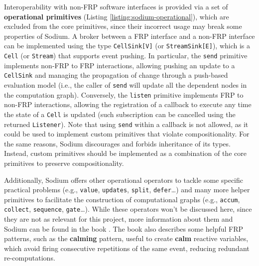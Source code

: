 Interoperability with non-\ac{FRP} software interfaces is provided via a set of
\textbf{operational primitives} (Listing \ref{listing:sodium-operational}),
which are excluded from the core primitives, since their incorrect usage may
break some properties of Sodium. A broker between a \ac{FRP} interface and a
non-\ac{FRP} interface can be implemented using the type \texttt{CellSink[V]}
(or \texttt{StreamSink[E]}), which is a \texttt{Cell} (or \texttt{Stream}) that
supports event pushing. In particular, the \texttt{send} primitive implements
non-FRP to FRP interactions, allowing pushing an update to a \texttt{CellSink}
and managing the propagation of change through a push-based evaluation model
(i.e., the caller of \texttt{send} will update all the dependent nodes in the
computation graph). Conversely, the \texttt{listen} primitive implements FRP to
non-FRP interactions, allowing the registration of a callback to execute any
time the state of a \texttt{Cell} is updated (such subscription can be
cancelled using the returned \texttt{Listener}). Note that using \texttt{send}
within a callback is not allowed, as it could be used to implement custom
primitives that violate compositionality. For the same reasons, Sodium
discourages and forbids inheritance of its types. Instead, custom primitives
should be implemented as a combination of the core primitives to preserve
compositionality.



Additionally, Sodium offers other operational operators to tackle some specific
practical problems (e.g., \texttt{value}, \texttt{updates}, \texttt{split},
\texttt{defer}\dots) and many more helper primitives to facilitate the
construction of computational graphs (e.g., \texttt{accum}, \texttt{collect},
\texttt{sequence}, \texttt{gate}\dots). While these operators won't be
discussed here, since they are not as relevant for this project, more
information about them and Sodium can be found in the book \cite{FRP}. The book
also describes some helpful \ac{FRP} patterns, such as the \textbf{calming}
pattern, useful to create \textbf{calm} reactive variables, which avoid firing
consecutive repetitions of the same event, reducing redundant re-computations.

